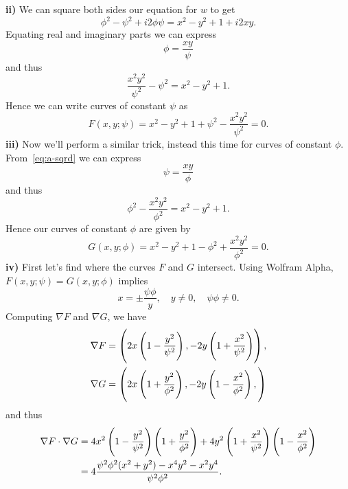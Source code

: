 \documentclass{article}
\begin{document}
\textbf{ii)} We can square both sides our equation for $w$
to get
%
\begin{equation}
    \phi^2 - \psi^2 + i 2 \phi \psi = x^2 - y^2 + 1 + i 2 x y
    \label{eq:a-sqrd}
    .
\end{equation}
%
Equating real and imaginary parts we can express
%
\begin{equation*}
    \phi = \frac{x y}{\psi}
\end{equation*}
%
and thus
%
\begin{equation*}
    \frac{x^2 y^2}{\psi^2} - \psi^2 = x^2 - y^2 + 1
    .
\end{equation*}
%
Hence we can write curves of constant $\psi$ as
%
\begin{equation*}
    F(x, y; \psi) = x^2 - y^2 + 1 + \psi^2 - \frac{x^2 y^2}{\psi^2} = 0
    .
\end{equation*}
%
\textbf{iii)} Now we'll perform a similar trick, instead this time for
curves of constant $\phi$. From~\eqref{eq:a-sqrd} we can express
%
\begin{equation*}
    \psi = \frac{x y}{\phi}
\end{equation*}
%
and thus
%
\begin{equation*}
    \phi^2 - \frac{x^2 y^2}{\phi^2} = x^2 - y^2 + 1
    .
\end{equation*}
%
Hence our curves of constant $\phi$ are given by
%
\begin{equation*}
    G(x, y; \phi) = x^2 - y^2 + 1 - \phi^2 + \frac{x^2 y^2}{\phi^2} = 0
    .
\end{equation*}
%
\textbf{iv)} First let's find where the curves $F$ and $G$ intersect.
Using Wolfram Alpha, $F(x, y; \psi) = G(x, y; \phi)$ implies
%
\begin{equation*}
    x = \pm \frac{\psi \phi}{y}, \quad y \neq 0, \quad \psi \phi \neq 0
    .
\end{equation*}
%
Computing $\nabla F$ and $\nabla G$, we have
%
\begin{align*}
    \nabla F &= \del{
        2 x \del{1 - \frac{y^2}{\psi^2}},
        - 2 y \del{1 + \frac{x^2}{\psi^2}}
    }, \\
    \nabla G &= \del{
        2 x \del{1 + \frac{y^2}{\phi^2}},
        - 2 y \del{1 - \frac{x^2}{\phi^2}},
    }
\end{align*}
%
and thus
%
\begin{align*}
    \nabla F \cdot \nabla G
        &= 4 x^2 \del{1 - \frac{y^2}{\psi^2}} \del{1 + \frac{y^2}{\phi^2}}
            + 4 y^2 \del{1 + \frac{x^2}{\psi^2}} \del{1 - \frac{x^2}{\phi^2}} \\
        &= 4 \frac{\psi^2 \phi^2 (x^2 + y^2) - x^4 y^2 - x^2 y^4}{\psi^2 \phi^2}
        .
\end{align*}
\end{document}
